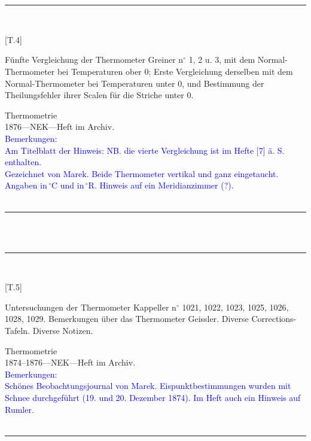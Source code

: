 \\
\vspace*{-2.5pt}\\
\parbox{\textwidth}{%
\rule{\textwidth}{1pt}\vspace*{-3mm}\\
\begin{minipage}[t]{0.2\textwidth}\vspace{0pt}
\Huge\rule[-4mm]{0cm}{1cm}[T.4]
\end{minipage}
\hfill
\begin{minipage}[t]{0.8\textwidth}\vspace{0pt}
\large Fünfte Vergleichung der Thermometer Greiner n{$^\circ$} 1, 2 u. 3, mit dem Normal-Thermometer bei Temperaturen ober 0; Erste Vergleichung derselben mit dem Normal-Thermometer bei Temperaturen unter 0, und Bestimmung der Theilungsfehler ihrer Scalen für die Striche unter 0.\rule[-2mm]{0mm}{2mm}
\end{minipage}
{\footnotesize\flushright
Thermometrie\\
}
1876\quad---\quad NEK\quad---\quad Heft im Archiv.\\
\textcolor{blue}{Bemerkungen:\\{}
Am Titelblatt der Hinweis: {\glqq}NB. die vierte Vergleichung ist im Hefte [7] ä. S. enthalten.{\grqq}\\{}
Gezeichnet von Marek. Beide Thermometer vertikal und ganz eingetaucht. Angaben in\,{$^\circ$}C und in\,{$^\circ$}R. Hinweis auf ein {\glqq}Meridianzimmer{\grqq} (?).\\{}
}
\\[-15pt]
\rule{\textwidth}{1pt}
}
\\
\vspace*{-2.5pt}\\
\parbox{\textwidth}{%
\rule{\textwidth}{1pt}\vspace*{-3mm}\\
\begin{minipage}[t]{0.2\textwidth}\vspace{0pt}
\Huge\rule[-4mm]{0cm}{1cm}[T.5]
\end{minipage}
\hfill
\begin{minipage}[t]{0.8\textwidth}\vspace{0pt}
\large Untersuchungen der Thermometer Kappeller n{$^\circ$} 1021, 1022, 1023, 1025, 1026, 1028, 1029. Bemerkungen über das Thermometer Geissler. Diverse Corrections-Tafeln. Diverse Notizen.\rule[-2mm]{0mm}{2mm}
\end{minipage}
{\footnotesize\flushright
Thermometrie\\
}
1874--1876\quad---\quad NEK\quad---\quad Heft im Archiv.\\
\textcolor{blue}{Bemerkungen:\\{}
Schönes Beobachtungsjournal von Marek. Eispunktbestimmungen wurden mit Schnee durchgeführt (19. und 20. Dezember 1874). Im Heft auch ein Hinweis auf Rumler.\\{}
}
\\[-15pt]
\rule{\textwidth}{1pt}
}
